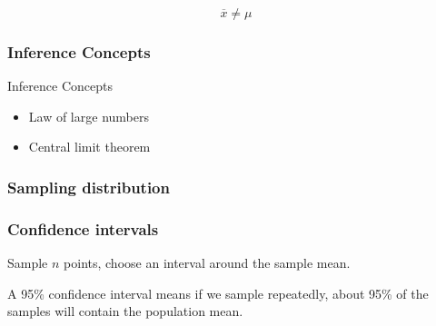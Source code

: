 \begin{frame}
  \vfill
  \begin{displaymath}
    \overline{x}\ne\mu
  \end{displaymath}
  \vfill
\end{frame}

\begin{frame}
  \frametitle{Inference Concepts}




\end{frame}

\begin{frame}{Inference Concepts}
    \begin{itemize}
    \item Law of large numbers
    \item Central limit theorem
    \end{itemize}
\end{frame}

\begin{frame}
  \frametitle{Sampling distribution}

\end{frame}

\begin{frame}
  \frametitle{Confidence intervals}

  Sample $n$ points, choose an interval around the sample mean.

  A 95\% confidence interval means if we sample repeatedly, about 95\%
  of the samples will contain the population mean.


\end{frame}



\begin{frame}
\end{frame}

